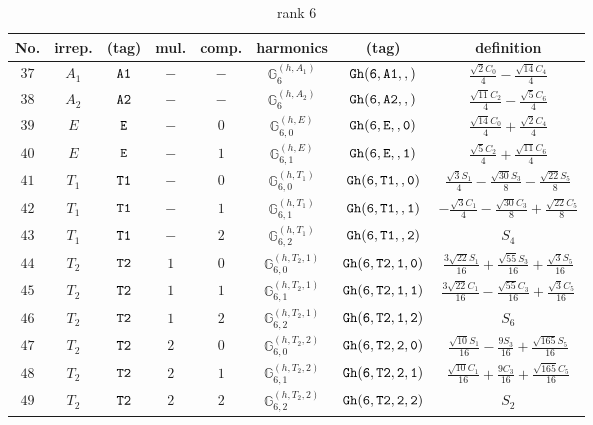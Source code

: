\documentclass[fleqn,8pt]{jsarticle}
\begin{document}
\begin{table}[ht!]
\begin{center}
\caption{rank 6}
\renewcommand{\arraystretch}{1.3}
\begin{tabular}{cccccccc} \hline \hline
No. & irrep. & (tag) & mul. & comp. & harmonics & (tag) & definition \\ \hline
$ 37 $ & $ A_{1} $ & $ {\tt A1} $ & $ - $ & $ - $ & $ \mathbb{G}_{6}^{(h,A_{1})} $ & $ {\tt Gh(6,A1,,)} $ & $ \frac{\sqrt{2} C_{0}}{4} - \frac{\sqrt{14} C_{4}}{4} $ \\
$ 38 $ & $ A_{2} $ & $ {\tt A2} $ & $ - $ & $ - $ & $ \mathbb{G}_{6}^{(h,A_{2})} $ & $ {\tt Gh(6,A2,,)} $ & $ \frac{\sqrt{11} C_{2}}{4} - \frac{\sqrt{5} C_{6}}{4} $ \\
$ 39 $ & $ E $ & $ {\tt E} $ & $ - $ & $ 0 $ & $ \mathbb{G}_{6,0}^{(h,E)} $ & $ {\tt Gh(6,E,,0)} $ & $ \frac{\sqrt{14} C_{0}}{4} + \frac{\sqrt{2} C_{4}}{4} $ \\
$ 40 $ & $ E $ & $ {\tt E} $ & $ - $ & $ 1 $ & $ \mathbb{G}_{6,1}^{(h,E)} $ & $ {\tt Gh(6,E,,1)} $ & $ \frac{\sqrt{5} C_{2}}{4} + \frac{\sqrt{11} C_{6}}{4} $ \\
$ 41 $ & $ T_{1} $ & $ {\tt T1} $ & $ - $ & $ 0 $ & $ \mathbb{G}_{6,0}^{(h,T_{1})} $ & $ {\tt Gh(6,T1,,0)} $ & $ \frac{\sqrt{3} S_{1}}{4} - \frac{\sqrt{30} S_{3}}{8} - \frac{\sqrt{22} S_{5}}{8} $ \\
$ 42 $ & $ T_{1} $ & $ {\tt T1} $ & $ - $ & $ 1 $ & $ \mathbb{G}_{6,1}^{(h,T_{1})} $ & $ {\tt Gh(6,T1,,1)} $ & $ - \frac{\sqrt{3} C_{1}}{4} - \frac{\sqrt{30} C_{3}}{8} + \frac{\sqrt{22} C_{5}}{8} $ \\
$ 43 $ & $ T_{1} $ & $ {\tt T1} $ & $ - $ & $ 2 $ & $ \mathbb{G}_{6,2}^{(h,T_{1})} $ & $ {\tt Gh(6,T1,,2)} $ & $ S_{4} $ \\
$ 44 $ & $ T_{2} $ & $ {\tt T2} $ & $ 1 $ & $ 0 $ & $ \mathbb{G}_{6,0}^{(h,T_{2},1)} $ & $ {\tt Gh(6,T2,1,0)} $ & $ \frac{3 \sqrt{22} S_{1}}{16} + \frac{\sqrt{55} S_{3}}{16} + \frac{\sqrt{3} S_{5}}{16} $ \\
$ 45 $ & $ T_{2} $ & $ {\tt T2} $ & $ 1 $ & $ 1 $ & $ \mathbb{G}_{6,1}^{(h,T_{2},1)} $ & $ {\tt Gh(6,T2,1,1)} $ & $ \frac{3 \sqrt{22} C_{1}}{16} - \frac{\sqrt{55} C_{3}}{16} + \frac{\sqrt{3} C_{5}}{16} $ \\
$ 46 $ & $ T_{2} $ & $ {\tt T2} $ & $ 1 $ & $ 2 $ & $ \mathbb{G}_{6,2}^{(h,T_{2},1)} $ & $ {\tt Gh(6,T2,1,2)} $ & $ S_{6} $ \\
$ 47 $ & $ T_{2} $ & $ {\tt T2} $ & $ 2 $ & $ 0 $ & $ \mathbb{G}_{6,0}^{(h,T_{2},2)} $ & $ {\tt Gh(6,T2,2,0)} $ & $ \frac{\sqrt{10} S_{1}}{16} - \frac{9 S_{3}}{16} + \frac{\sqrt{165} S_{5}}{16} $ \\
$ 48 $ & $ T_{2} $ & $ {\tt T2} $ & $ 2 $ & $ 1 $ & $ \mathbb{G}_{6,1}^{(h,T_{2},2)} $ & $ {\tt Gh(6,T2,2,1)} $ & $ \frac{\sqrt{10} C_{1}}{16} + \frac{9 C_{3}}{16} + \frac{\sqrt{165} C_{5}}{16} $ \\
$ 49 $ & $ T_{2} $ & $ {\tt T2} $ & $ 2 $ & $ 2 $ & $ \mathbb{G}_{6,2}^{(h,T_{2},2)} $ & $ {\tt Gh(6,T2,2,2)} $ & $ S_{2} $ \\
 \hline \hline
\end{tabular}
\end{center}
\end{table}
\end{document}
